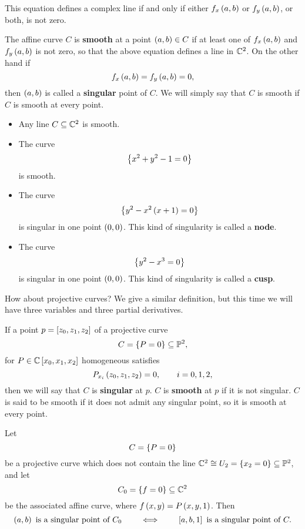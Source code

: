 \begin{note*}
This equation defines a complex line if and only if either $ f_x\rb{a, b} $ or $ f_y\rb{a, b} $, or both, is not zero.
\end{note*}

\begin{definition}
The affine curve $ C $ is \textbf{smooth} at a point $ \rb{a, b} \in C $ if at least one of $ f_x\rb{a, b} $ and $ f_y\rb{a, b} $ is not zero, so that the above equation defines a line in $ \C^2 $. On the other hand if
$$ f_x\rb{a, b} = f_y\rb{a, b} = 0, $$
then $ \rb{a, b} $ is called a \textbf{singular} point of $ C $. We will simply say that $ C $ is smooth if $ C $ is smooth at every point.
\end{definition}

\begin{example}
\hfill
\begin{itemize}
\item Any line $ C \subseteq \C^2 $ is smooth.
\item The curve
$$ \cb{x^2 + y^2 - 1 = 0} $$
is smooth.
\item The curve
$$ \cb{y^2 - x^2\rb{x + 1} = 0} $$
is singular in one point $ \rb{0, 0} $. This kind of singularity is called a \textbf{node}.
\item The curve
$$ \cb{y^2 - x^3 = 0} $$
is singular in one point $ \rb{0, 0} $. This kind of singularity is called a \textbf{cusp}.
\end{itemize}
\end{example}

\pagebreak

How about projective curves? We give a similar definition, but this time we will have three variables and three partial derivatives.

\begin{definition}
If a point $ p = \sb{z_0, z_1, z_2} $ of a projective curve
$$ C = \cb{P = 0} \subseteq \P^2, $$
for $ P \in \C\sb{x_0, x_1, x_2} $ homogeneous satisfies
$$ P_{x_i}\rb{z_0, z_1, z_2} = 0, \qquad i = 0, 1, 2, $$
then we will say that $ C $ is \textbf{singular} at $ p $. $ C $ is \textbf{smooth} at $ p $ if it is not singular. $ C $ is said to be smooth if it does not admit any singular point, so it is smooth at every point.
\end{definition}

\begin{lemma}
\label{lem:7.5}
Let
$$ C = \cb{P = 0} $$
be a projective curve which does not contain the line $ \C^2 \cong U_2 = \cb{x_2 = 0} \subseteq \P^2 $, and let
$$ C_0 = \cb{f = 0} \subseteq \C^2 $$
be the associated affine curve, where $ f\rb{x, y} = P\rb{x, y, 1} $. Then
$$ \rb{a, b} \ \text{is a singular point of} \ C_0 \qquad \iff \qquad \sb{a, b, 1} \ \text{is a singular point of} \ C. $$
\end{lemma}


